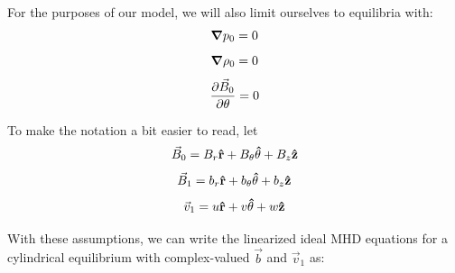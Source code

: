 \documentclass[%
 reprint,
 amsmath,amssymb,
 aps,
]{revtex4-2}
\begin{document}
For the purposes of our model, we will also limit ourselves to equilibria with:
\begin{equation}
\grad p_0 = 0
\end{equation}
\begin{equation}
\grad \rho_0 = 0
\end{equation}
\begin{equation}
\pdv{\vec B_0}{\theta} = 0
\end{equation}

To make the notation a bit easier to read, let
\begin{equation}
\vec B_0 = B_r \vu r + B_\theta \vu \theta + B_z \vu z
\end{equation}
\begin{equation}
\vec B_1 = b_r \vu r + b_\theta \vu \theta + b_z \vu z
\end{equation}
\begin{equation}
\vec v_1 = u \vu r + v \vu \theta + w \vu z
\end{equation}

With these assumptions, we can write the linearized ideal MHD equations for a cylindrical equilibrium with complex-valued $\vec b$ and $\vec v_1$ as:
\end{document}
